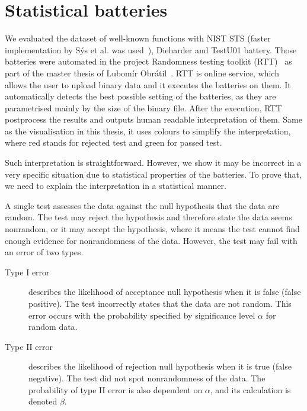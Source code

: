\documentclass[
  print, %
  Table,   %
  nolof,     %
  nolot,     %
  11pt, %
  oneside  %
]{fithesis3}
\begin{document}
\section{Statistical batteries}
\label{sec:relatwork-stat}


We evaluated the dataset of well-known functions with NIST STS (faster implementation by Sýs et al. was used~\cite{sys2016algorithm}), Dieharder and TestU01 battery. Those batteries were automated in the project Randomness testing toolkit (RTT)~\cite{rttgit} as part of the master thesis of Lubomír Obrátil~\cite{obratilMgrThesis}. RTT is online service, which allows the user to upload binary data and it executes the batteries on them. It automatically detects the best possible setting of the batteries, as they are parametrised mainly by the size of the binary file. After the execution, RTT postprocess the results and outputs human readable interpretation of them. Same as the visualisation in this thesis, it uses colours to simplify the interpretation, where red stands for rejected test and green for passed test.

Such interpretation is straightforward. However, we show it may be incorrect in a very specific situation due to statistical properties of the batteries. To prove that, we need to explain the interpretation in a statistical manner.

A single test assesses the data against the null hypothesis that the data are random. The test may reject the hypothesis and therefore state the data seems nonrandom, or it may accept the hypothesis, where it means the test cannot find enough evidence for nonrandomness of the data. However, the test may fail with an error of two types.

\begin{description}
    \item[Type I error] describes the likelihood of acceptance null hypothesis when it is false (false positive). The test incorrectly states that the data are not random. This error occurs with the probability specified by significance level $\alpha$ for random data.
    \item[Type II error] describes the likelihood of rejection null hypothesis when it is true (false negative). The test did not spot nonrandomness of the data. The probability of type II error is also dependent on $\alpha$, and its calculation is denoted $\beta$.
\end{description}
\end{document}
